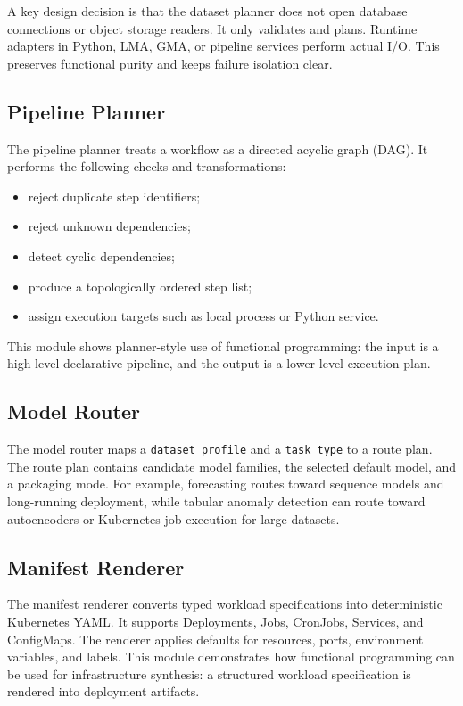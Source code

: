\documentclass[conference]{IEEEtran}
\begin{document}
A key design decision is that the dataset planner does not open database
connections or object storage readers. It only validates and plans. Runtime
adapters in Python, LMA, GMA, or pipeline services perform actual I/O. This
preserves functional purity and keeps failure isolation clear.

\subsection{Pipeline Planner}

The pipeline planner treats a workflow as a directed acyclic graph (DAG). It
performs the following checks and transformations:

\begin{itemize}
  \item reject duplicate step identifiers;
  \item reject unknown dependencies;
  \item detect cyclic dependencies;
  \item produce a topologically ordered step list;
  \item assign execution targets such as local process or Python service.
\end{itemize}

This module shows planner-style use of functional programming: the input is a
high-level declarative pipeline, and the output is a lower-level execution plan.

\subsection{Model Router}

The model router maps a \texttt{dataset\_profile} and a \texttt{task\_type} to
a route plan. The route plan contains candidate model families, the selected
default model, and a packaging mode. For example, forecasting routes toward
sequence models and long-running deployment, while tabular anomaly detection can
route toward autoencoders or Kubernetes job execution for large datasets.

\subsection{Manifest Renderer}

The manifest renderer converts typed workload specifications into deterministic
Kubernetes YAML. It supports Deployments, Jobs, CronJobs, Services, and
ConfigMaps. The renderer applies defaults for resources, ports, environment
variables, and labels. This module demonstrates how functional programming can
be used for infrastructure synthesis: a structured workload specification is
rendered into deployment artifacts.
\end{document}
